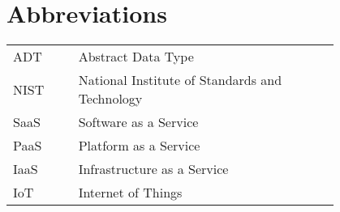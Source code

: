 \chapter*{Abbreviations}

\begin{flushleft}
\begin{tabular}{l p{0.8\linewidth}}
ADT      & Abstract Data Type\\
NIST     & National Institute of Standards and Technology\\
SaaS     & Software as a Service\\
PaaS     & Platform as a Service\\
IaaS     & Infrastructure as a Service\\
IoT 	 & Internet of Things
\end{tabular}
\end{flushleft}

